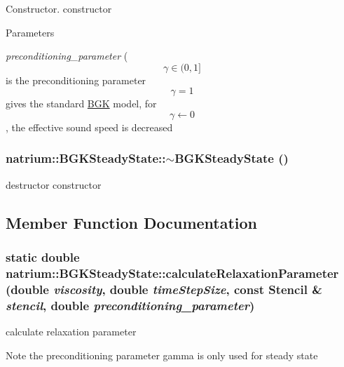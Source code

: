 Constructor. constructor


\begin{DoxyParams}{Parameters}
\item[{\em preconditioning\_\-parameter}](\[ \gamma \in (0,1] \] is the preconditioning parameter \[ \gamma = 1 \] gives the standard \hyperlink{classnatrium_1_1BGK}{BGK} model, for \[ \gamma \leftarrow 0 \], the effective sound speed is decreased \end{DoxyParams}
\hypertarget{classnatrium_1_1BGKSteadyState_ab2c58f1d6b964179a2abeb5f54aa5edc}{
\subsubsection[{$\sim$BGKSteadyState}]{\setlength{\rightskip}{0pt plus 5cm}natrium::BGKSteadyState::$\sim$BGKSteadyState ()}}
\label{classnatrium_1_1BGKSteadyState_ab2c58f1d6b964179a2abeb5f54aa5edc}


destructor constructor 

\subsection{Member Function Documentation}
\hypertarget{classnatrium_1_1BGKSteadyState_a2cd6628c71475663e204656147de99b8}{
\subsubsection[{calculateRelaxationParameter}]{\setlength{\rightskip}{0pt plus 5cm}static double natrium::BGKSteadyState::calculateRelaxationParameter (double {\em viscosity}, \/  double {\em timeStepSize}, \/  const {\bf Stencil} \& {\em stencil}, \/  double {\em preconditioning\_\-parameter})}}
\label{classnatrium_1_1BGKSteadyState_a2cd6628c71475663e204656147de99b8}


calculate relaxation parameter \begin{DoxyNote}{Note}
the preconditioning parameter gamma is only used for steady state 
\end{DoxyNote}


